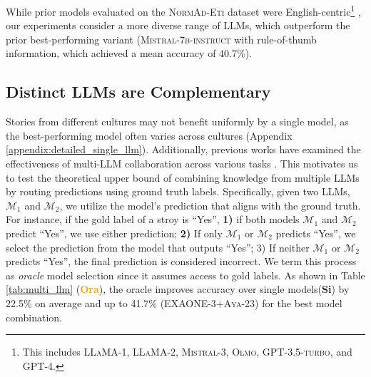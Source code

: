 While prior models evaluated on the \textsc{NormAd-Eti} dataset were English-centric\footnote{This includes \textsc{LLaMA-1}, \textsc{LLaMA-2}, \textsc{Mistral-3}, \textsc{Olmo}, \textsc{GPT-3.5-turbo}, and \textsc{GPT-4}.} \cite{normad}, our experiments consider a more diverse range of LLMs, which outperform the prior best-performing variant (\textsc{Mistral-7b-instruct} \cite{mistral} with rule-of-thumb information, which achieved a mean accuracy of 40.7\%). 






\subsection{Distinct LLMs are Complementary}%
\label{sec:oracle}
Stories from different cultures may not benefit uniformly by a single model, as the best-performing model often varies across cultures (Appendix \ref{appendix:detailed_single_llm}). Additionally, previous works have examined the effectiveness of multi-LLM collaboration across various tasks \cite{estornell2024multillm, du2023improvingfactualityreasoninglanguage, liang-etal-2024-encouraging}. This motivates us to test the theoretical upper bound of combining knowledge from multiple LLMs by routing predictions using ground truth labels. Specifically, given two LLMs, $\mathcal{M}_1$ and $\mathcal{M}_2$, we utilize the model's prediction that aligns with the ground truth. For instance, if the gold label of a stroy is ``Yes'', \textbf{1)} if both models $\mathcal{M}_1$ and $\mathcal{M}_2$ predict ``Yes'', we use either prediction; \textbf{2)} If only $\mathcal{M}_1$ or $\mathcal{M}_2$ predicts ``Yes'', we select the prediction from the model that outputs ``Yes''; 3) If neither $\mathcal{M}_1$ or $\mathcal{M}_2$ predicts ``Yes'', the final prediction is considered incorrect. We term this process as \textit{oracle} model selection since it assumes access to gold labels. As shown in Table \ref{tab:multi_llm} (\textcolor{orange}{\textbf{Ora}}), the oracle improves accuracy over single models(\textbf{Si}) by 22.5\% on average and up to 41.7\% (\textsc{EXAONE-3}+\textsc{Aya-23}) for the best model combination.

